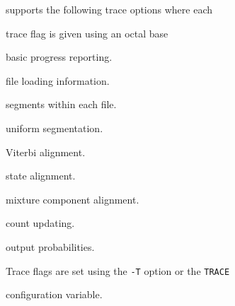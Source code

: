









 supports the following trace options where each


trace flag is given using an octal base


\begin{optlist}


    basic progress reporting.


    file loading information.


    segments within each file.


    uniform segmentation.


    Viterbi alignment.


    state alignment.


    mixture component alignment.


    count updating.


    output probabilities.


\end{optlist}


Trace flags are set using the \texttt{-T} option or the  \texttt{TRACE} 


configuration variable.


















